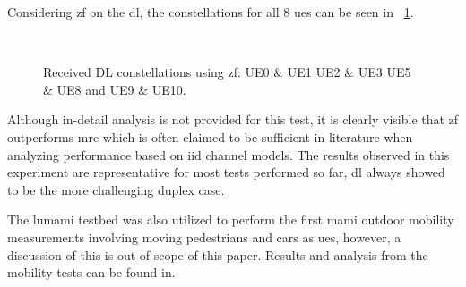 \documentclass[journal]{IEEEtran}
\begin{document}
%
%
Considering \gls{zf} on the \gls{dl}, the constellations for all 8 \glspl{ue} can be seen in \figurename~\ref{fig:DL_const_outdoor}.
\begin{figure}[!t]
	\centering
	\subfloat[]{\usebox{\myimage}
		\label{subfig:T01}}
	\\
	\hspace{0.1cm}%
	\subfloat[]{\usebox{\myimage}
		\label{subfig:T03}}
	\caption{Received DL constellations using \gls{zf}: \protect{} UE0 \& UE1 \protect{} UE2 \& UE3 \protect{} UE5 \& UE8 and \protect{} UE9 \& UE10.}
	\label{fig:DL_const_outdoor}
\end{figure} 
Although in-detail analysis is not provided for this test, it is clearly visible that \gls{zf} outperforms \gls{mrc} which is often claimed to be sufficient in literature when analyzing performance based on \gls{iid} channel models\cite{Marzetta2010}.
%
%
The results observed in this experiment are representative for most tests performed so far, \ie \gls{dl} always showed to be the more challenging duplex case. 

The \gls{lumami} testbed was also utilized to perform the first \gls{mami} outdoor mobility measurements involving moving pedestrians and cars as \glspl{ue}, however, a discussion of this is out of scope of this paper.
Results and analysis from the mobility tests can be found in\cite{2017arXiv170108818H}.

%
%
%
%
%
%
%
%
%
%
%
%
%
%
%
%
%
%
%
%
%
%
%
%
%
%
%
%
%
%
%
%
%
%
%
%
%

%
%


%
%
%
%
%
%
%
%
%
%
%
%
%
%
%
%
%
%
%
%
%
%
%
%
%
%


%
%
%
%
%
%
%
%
%
%
%
%
%
%
%
%
%
%
%
%
%
%
%
%
%
%
%


%
%
%
%
%
%
%
%
%



%
\end{document}
